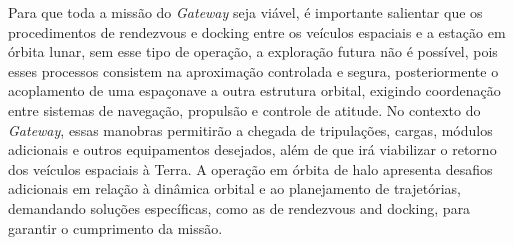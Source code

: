 Para que toda a missão do \textit{Gateway} seja viável, é importante salientar que os procedimentos de rendezvous e docking entre os veículos espaciais e a estação em órbita lunar, sem esse tipo de operação, a exploração futura não é possível, pois esses processos consistem na aproximação controlada e segura, posteriormente o acoplamento de uma espaçonave a outra estrutura orbital, exigindo coordenação entre sistemas de navegação, propulsão e controle de atitude. No contexto do \textit{Gateway}, essas manobras permitirão a chegada de tripulações, cargas, módulos adicionais e outros equipamentos desejados, além de que irá viabilizar o retorno dos veículos espaciais à Terra. A operação em órbita de halo apresenta desafios adicionais em relação à dinâmica orbital e ao planejamento de trajetórias, demandando soluções específicas, como as de rendezvous and docking, para garantir o cumprimento da missão.

